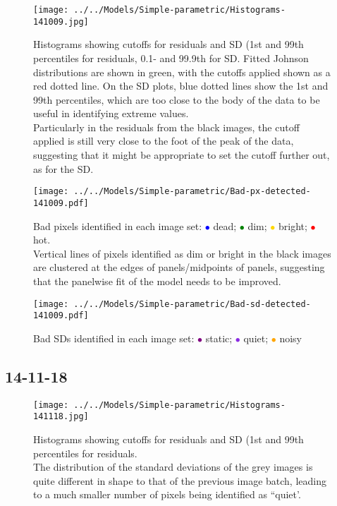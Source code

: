 \documentclass[10pt,fleqn]{article}
\begin{document}
\begin{figure}[!h]
\caption{Histograms showing cutoffs for residuals and SD (1st and 99th percentiles for residuals, 0.1- and 99.9th for SD. Fitted Johnson distributions are shown in green, with the cutoffs applied shown as a red dotted line. On the SD plots, blue dotted lines show the 1st and 99th percentiles, which are too close to the body of the data to be useful in identifying extreme values.\\
Particularly in the residuals from the black images, the cutoff applied is still very close to the foot of the peak of the data, suggesting that it might be appropriate to set the cutoff further out, as for the SD.}
\texttt{[image: ../../Models/Simple-parametric/Histograms-141009.jpg]}
\end{figure}
 
\begin{figure}[!h]
\caption{Bad pixels identified in each image set: 
\textcolor{blue}{$\bullet$} dead; \textcolor{green}{$\bullet$} dim;  \textcolor{gold}{$\bullet$} bright; \textcolor{red}{$\bullet$} hot.\\
Vertical lines of pixels identified as dim or bright in the black images are clustered at the edges of panels/midpoints of panels, suggesting that the panelwise fit of the model needs to be improved.}
\texttt{[image: ../../Models/Simple-parametric/Bad-px-detected-141009.pdf]}
\end{figure}


\begin{figure}[!h]
\caption{Bad SDs identified in each image set: 
\textcolor{purple}{$\bullet$} static; \textcolor{BlueViolet}{$\bullet$} quiet;  \textcolor{orange}{$\bullet$} noisy}
\texttt{[image: ../../Models/Simple-parametric/Bad-sd-detected-141009.pdf]}
\end{figure}


\FloatBarrier
\subsection*{14-11-18}

\begin{figure}[!h]
\caption{Histograms showing cutoffs for residuals and SD (1st and 99th percentiles for residuals.\\
The distribution of the standard deviations of the grey images is quite different in shape to that of the previous image batch, leading to a much smaller number of pixels being identified as ``quiet'.}
\texttt{[image: ../../Models/Simple-parametric/Histograms-141118.jpg]}
\end{figure}
\end{document}
